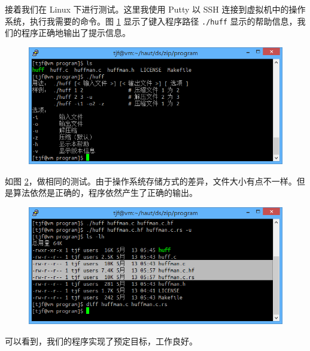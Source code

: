 接着我们在 Linux 下进行测试。这里我使用 Putty 以 SSH 连接到虚拟机中的操作系统，执行我需要的命令。图 \ref{linux_huff} 显示了键入程序路径 \verb|./huff| 显示的帮助信息，我们的程序正确地输出了提示信息。

\begin{figure}[htp]
\includegraphics[width=\textwidth]{image/linux_huff.png}
\caption{\label{linux_huff}}
\end{figure}

如图 \ref{linux_test}，做相同的测试。由于操作系统存储方式的差异，文件大小有点不一样。但是算法依然是正确的，程序依然产生了正确的输出。

\begin{figure}[htp]
\includegraphics[width=\textwidth]{image/linux_test.png}
\caption{\label{linux_test}}
\end{figure}

可以看到，我们的程序实现了预定目标，工作良好。
